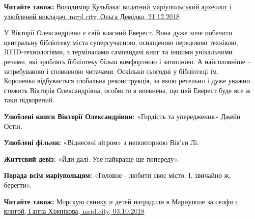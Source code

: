 \textbf{Читайте також:} \href{https://mrpl.city/blogs/view/volodimir-kulbaka-vidatnij-mariupolskij-arheolog-i-ulyublenij-vikladach}{%
Володимир Кульбака: видатний маріупольський археолог і улюблений викладач, %
mrpl.city, Ольга Демідко, 21.12.2018%
}

У Вікторії Олександрівни є свій власний Еверест. Вона дуже хоче побачити
центральну бібліотеку міста суперсучасною, оснащеною передовою технікою,
RFID-технологіями, з терміналами самовидачі книг та іншими унікальними речами,
які зроблять бібліотеку більш комфортною і затишною. А найголовніше
–затребуваною і сповненою читачами. Оскільки сьогодні у бібліотеці ім.
Короленка відбувається глобальна реконструкція, за якою ретельно і дуже уважно
стежить Вікторія Олександрівна, особисто я впевнена, що цей Еверест буде все ж
таки підкорений.

\textbf{Улюблені книги Вікторії Олександрівни:} «Гордість та упередження» Джейн Остін.

\textbf{Улюблені фільми:} «Віднесені вітром» з неповторною Вів'єн Лі.

\textbf{Життєвий девіз:} «Йди далі. Усе найкраще ще попереду».

\textbf{Порада всім маріупольцям:} «Головне - любити своє місто. І, звичайно ж, берегти».

\textbf{Читайте також:} \href{https://mrpl.city/news/view/morskuyu-svinku-i-detej-nagradili-v-mariupole-za-selfi-s-knigoj-foto}{%
Морскую свинку и детей наградили в Мариуполе за селфи с книгой, %
Ганна Хіжнікова, mrpl.city, 03.10.2018%
}
